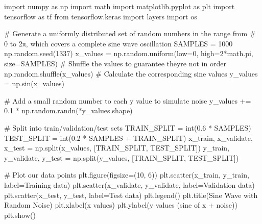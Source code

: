 \documentclass[
  9pt,
  letterpaper,
  abstract,
  titlepage]{scrbook}
\newenvironment{Shaded}{\begin{snugshade}}{\end{snugshade}}
\newcommand{\BuiltInTok}[1]{\textcolor[rgb]{0.00,0.23,0.31}{#1}}
\newcommand{\CommentTok}[1]{\textcolor[rgb]{0.37,0.37,0.37}{#1}}
\newcommand{\DecValTok}[1]{\textcolor[rgb]{0.68,0.00,0.00}{#1}}
\newcommand{\FloatTok}[1]{\textcolor[rgb]{0.68,0.00,0.00}{#1}}
\newcommand{\ImportTok}[1]{\textcolor[rgb]{0.00,0.46,0.62}{#1}}
\newcommand{\NormalTok}[1]{\textcolor[rgb]{0.00,0.23,0.31}{#1}}
\newcommand{\OperatorTok}[1]{\textcolor[rgb]{0.37,0.37,0.37}{#1}}
\newcommand{\StringTok}[1]{\textcolor[rgb]{0.13,0.47,0.30}{#1}}
\begin{document}
\begin{Shaded}
\begin{Highlighting}[]
\ImportTok{import}\NormalTok{ numpy }\ImportTok{as}\NormalTok{ np}
\ImportTok{import}\NormalTok{ math}
\ImportTok{import}\NormalTok{ matplotlib.pyplot }\ImportTok{as}\NormalTok{ plt}
\ImportTok{import}\NormalTok{ tensorflow }\ImportTok{as}\NormalTok{ tf}
\ImportTok{from}\NormalTok{ tensorflow.keras }\ImportTok{import}\NormalTok{ layers}
\ImportTok{import}\NormalTok{ os}

\CommentTok{\# Generate a uniformly distributed set of random numbers in the range from}
\CommentTok{\# 0 to 2π, which covers a complete sine wave oscillation}
\NormalTok{SAMPLES }\OperatorTok{=} \DecValTok{1000}
\NormalTok{np.random.seed(}\DecValTok{1337}\NormalTok{)}
\NormalTok{x\_values }\OperatorTok{=}\NormalTok{ np.random.uniform(low}\OperatorTok{=}\DecValTok{0}\NormalTok{, high}\OperatorTok{=}\DecValTok{2}\OperatorTok{*}\NormalTok{math.pi, size}\OperatorTok{=}\NormalTok{SAMPLES)}
\CommentTok{\# Shuffle the values to guarantee they\textquotesingle{}re not in order}
\NormalTok{np.random.shuffle(x\_values)}
\CommentTok{\# Calculate the corresponding sine values}
\NormalTok{y\_values }\OperatorTok{=}\NormalTok{ np.sin(x\_values)}

\CommentTok{\# Add a small random number to each y value to simulate noise}
\NormalTok{y\_values }\OperatorTok{+=} \FloatTok{0.1} \OperatorTok{*}\NormalTok{ np.random.randn(}\OperatorTok{*}\NormalTok{y\_values.shape)}

\CommentTok{\# Split into train/validation/test sets}
\NormalTok{TRAIN\_SPLIT }\OperatorTok{=} \BuiltInTok{int}\NormalTok{(}\FloatTok{0.6} \OperatorTok{*}\NormalTok{ SAMPLES)}
\NormalTok{TEST\_SPLIT }\OperatorTok{=} \BuiltInTok{int}\NormalTok{(}\FloatTok{0.2} \OperatorTok{*}\NormalTok{ SAMPLES }\OperatorTok{+}\NormalTok{ TRAIN\_SPLIT)}
\NormalTok{x\_train, x\_validate, x\_test }\OperatorTok{=}\NormalTok{ np.split(x\_values, [TRAIN\_SPLIT, TEST\_SPLIT])}
\NormalTok{y\_train, y\_validate, y\_test }\OperatorTok{=}\NormalTok{ np.split(y\_values, [TRAIN\_SPLIT, TEST\_SPLIT])}

\CommentTok{\# Plot our data points}
\NormalTok{plt.figure(figsize}\OperatorTok{=}\NormalTok{(}\DecValTok{10}\NormalTok{, }\DecValTok{6}\NormalTok{))}
\NormalTok{plt.scatter(x\_train, y\_train, label}\OperatorTok{=}\StringTok{\textquotesingle{}Training data\textquotesingle{}}\NormalTok{)}
\NormalTok{plt.scatter(x\_validate, y\_validate, label}\OperatorTok{=}\StringTok{\textquotesingle{}Validation data\textquotesingle{}}\NormalTok{)}
\NormalTok{plt.scatter(x\_test, y\_test, label}\OperatorTok{=}\StringTok{\textquotesingle{}Test data\textquotesingle{}}\NormalTok{)}
\NormalTok{plt.legend()}
\NormalTok{plt.title(}\StringTok{\textquotesingle{}Sine Wave with Random Noise\textquotesingle{}}\NormalTok{)}
\NormalTok{plt.xlabel(}\StringTok{\textquotesingle{}x values\textquotesingle{}}\NormalTok{)}
\NormalTok{plt.ylabel(}\StringTok{\textquotesingle{}y values (sine of x + noise)\textquotesingle{}}\NormalTok{)}
\NormalTok{plt.show()}
\end{Highlighting}
\end{Shaded}
\end{document}
